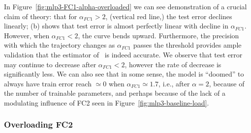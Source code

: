 In Figure~\ref{fig:mlp3-FC1-alpha-overloaded} we can see 
demonstration of a crucial claim of \SETOL theory: that for $\alpha_{FC1} > 2$, (vertical red line,) the test 
error declines linearly; (b) shows that test error is almost perfectly linear with decline in $\alpha_{FC1}$. However, when $\alpha_{FC1} < 2$, the curve bends 
upward. 
Furthermore, the precision with which the trajectory changes as $\alpha_{FC1}$ passes the threshold provides ample 
validation that the estimator of~\cite{CSN09_powerlaw} is indeed accurate. We 
observe that test error may continue to decrease after $\alpha_{FC1} < 2$, however the rate of decrease is significantly less. 
We can also see that in some sense, the model is ``doomed'' to always have train error reach $\simeq 0$ when 
$\alpha_{FC1} \simeq 1.7$, i.e., after $\alpha = 2$, because of the number of trainable parameters, and perhaps because 
of the lack of a modulating influence of FC2 seen in Figure~\ref{fig:mlp3-baseline-load}.





\subsubsection{Overloading FC2}
\label{sxn:hysteresis_effect_FC2}

